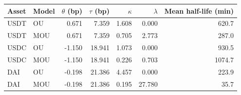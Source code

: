 \begin{tabular}{llrrrrr}
\toprule
Asset & Model & $\theta$ (bp) & $\tau$ (bp) & $\kappa$ & $\lambda$ & Mean half-life (min)\\
\midrule
USDT & OU & 0.671 & 7.359 & 1.608 & 0.000 & 620.7 \tabularnewline
USDT & MOU & 0.671 & 7.359 & 0.705 & 2.773 & 287.0 \tabularnewline
USDC & OU & -1.150 & 18.941 & 1.073 & 0.000 & 930.5 \tabularnewline
USDC & MOU & -1.150 & 18.941 & 0.226 & 0.703 & 1074.7 \tabularnewline
DAI & OU & -0.198 & 21.386 & 4.457 & 0.000 & 223.9 \tabularnewline
DAI & MOU & -0.198 & 21.386 & 0.195 & 27.780 & 35.7 \tabularnewline
\bottomrule
\end{tabular}

